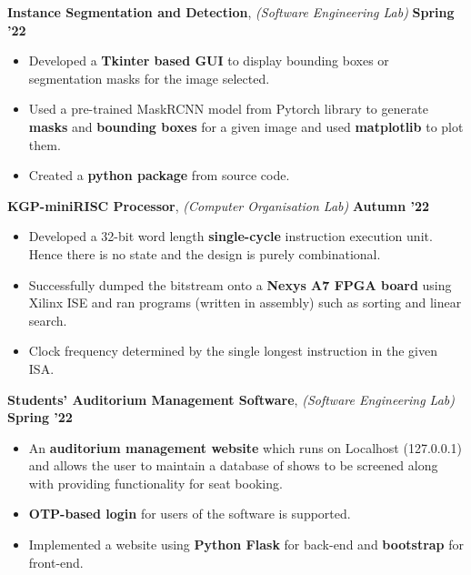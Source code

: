 \documentclass[10pt]{article}
\begin{document}
{\color{headliner} \spacedhrule{0.15ex}{1.0ex}}

\large {\textbf{Instance Segmentation and Detection}, \emph{(Software Engineering Lab)} {\href{https://github.com/rv4102/CS29202-Codes/tree/main/A4}{\faGithub}}} \normalsize 
{\hfill} \textbf{Spring '22}\\[-1.75em]
\begin{itemize}
    \item Developed a \textbf{Tkinter based GUI} to display bounding boxes or segmentation masks for the image selected.\\[-1.9em]
    \item Used a pre-trained MaskRCNN model from Pytorch library to generate \textbf{masks} and \textbf{bounding boxes} for a given image and used \textbf{matplotlib} to plot them. \\[-1.9em]
    \item Created a \textbf{python package} from source code. \\[-1.5em]
\end{itemize}
\large {\textbf{KGP-miniRISC Processor}, \emph{(Computer Organisation Lab)} {\href{https://github.com/rv4102/CompOrg-Lab/tree/main/A6_KGP_miniRISC_Processor}{\faGithub}}} \normalsize 
{\hfill} \textbf{Autumn '22}\\[-1.75em]
\begin{itemize}
    \item Developed a 32-bit word length \textbf{single-cycle} instruction execution unit. Hence there is no state and the design is purely combinational. \\[-1.9em]
    \item Successfully dumped the bitstream onto a \textbf{Nexys A7 FPGA board} using Xilinx ISE and ran programs (written in assembly) such as sorting and linear search. \\[-1.9em]
    \item Clock frequency determined by the single longest instruction in the given ISA. \\[-1.5em]
\end{itemize}
\large {\textbf{Students' Auditorium Management Software}, \emph{(Software Engineering Lab)} {\href{https://github.com/rv4102/AudiBooking}{\faGithub}}} \normalsize
{\hfill} \textbf{Spring '22}\\[-1.75em]
\begin{itemize}
    \item An \textbf{auditorium management website} which runs on Localhost (127.0.0.1) and allows the user to maintain a database of shows to be screened along with providing functionality for seat booking.\\[-1.9em]
    \item \textbf{OTP-based login} for users of the software is supported. \\[-1.9em]
    \item Implemented a website using \textbf{Python Flask} for back-end and \textbf{bootstrap} for front-end. \\[-1.5em]
\end{itemize}
\end{document}
